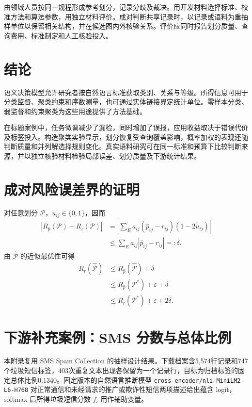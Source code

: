 \documentclass[UTF8,a4paper,zihao=-4,fontset=fandol]{ctexart}
\begin{document}
由领域人员按同一规程形成参考划分，记录分歧及裁决。用开发材料选择标准、校准方法和算法参数，用独立材料评价。成对判断共享记录时，以记录或语料为重抽样单位以保留相关结构，并在候选图内外核验关系。评价应同时报告划分质量、查询费用、标准制定和人工核验投入。

\section{结论}\label{sec:conclusion}

语义决策模型允许研究者按自然语言标准获取类别、关系与等级。所得信息可用于分类监督、聚类约束和序数测量，也可通过实体链接界定统计单位。零样本分类、弱监督和约束聚类为这些用途提供了方法基础。

在标题案例中，任务微调减少了漏检，同时增加了误报，应用收益取决于错误代价及标签投入。构造聚类实验显示，划分恢复受查询覆盖影响，概率加权的表现还随判断质量和并列解选择规则变化。真实语料研究可在同一标准和预算下比较判断来源，并以独立核验材料检验局部误差、划分质量及下游统计结果。

\appendix
\section{成对风险误差界的证明}\label{app:bound}

对任意划分 $\mathcal P$，$u_{ij}\in\{0,1\}$，因而
\begin{align}
 |R_{\widehat p}(\mathcal P)-R_r(\mathcal P)|
 &=\left|\sum_E a_{ij}(\widehat p_{ij}-r_{ij})(1-2u_{ij})\right|\\
 &\leq\sum_E a_{ij}|\widehat p_{ij}-r_{ij}|=:\delta.
\end{align}
由 $\widehat{\mathcal P}$ 的近似最优性可得
\begin{align}
 R_r(\widehat{\mathcal P})
 &\leq R_{\widehat p}(\widehat{\mathcal P})+\delta\\
 &\leq R_{\widehat p}(\mathcal P^*)+\varepsilon+\delta\\
 &\leq R_r(\mathcal P^*)+\varepsilon+2\delta.
\end{align}

\section{下游补充案例：SMS 分数与总体比例}\label{sec:sms}

本附录复用 SMS Spam Collection 的抽样设计结果\citep{sms-data}。下载档案含5,574行记录和747个垃圾短信标签，403次重复文本出现各保留为一个记录行，目标为归档标签的固定总体比例0.1340。固定版本的自然语言推断模型 \nolinkurl{cross-encoder/nli-MiniLM2-L6-H768} 对正常通信和未经请求的推广或欺诈性短信两项描述给出蕴含 logit，softmax 后所得垃圾短信分数 $f_i$ 用作辅助变量\citep{sms-model}。
\end{document}
